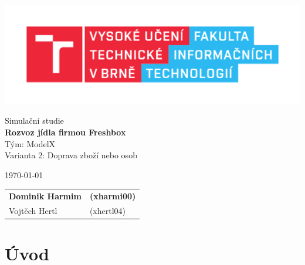 \documentclass[a4paper, 11pt]{article}
\begin{document}
	\begin{titlepage}
		\begin{center}
			\includegraphics[width=0.77\linewidth]{inc/FIT_logo.pdf} \\


			\Huge{Simulační studie} \\
			\LARGE{\textbf{Rozvoz jídla firmou Freshbox}} \\
			\Large{Tým: ModelX} \\
			\Large{Varianta 2: Doprava zboží nebo osob}

		\end{center}

		\begin{minipage}{0.5 \textwidth}
			{\Large \today}
		\end{minipage}
		\hfill
		\begin{minipage}[r]{0.5 \textwidth}
			\Large
			\begin{tabular}{l l}
				\textbf{Dominik Harmim} & \textbf{(xharmi00)} \\
				Vojtěch Hertl & (xhertl04) \\
			\end{tabular}
		\end{minipage}
	\end{titlepage}



	\setcounter{page}{1}
	\tableofcontents
	\clearpage



	\setcounter{page}{1}

	\section{Úvod}
\end{document}

